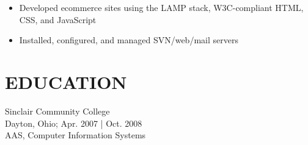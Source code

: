 \documentclass[margin,10pt]{res} %
\begin{document}
\begin{resume}
	\begin{itemize}
		\item Developed ecommerce sites using the LAMP stack, W3C-compliant HTML, CSS, and JavaScript
		\item Installed, configured, and managed SVN/web/mail servers
	\end{itemize}


	\section{EDUCATION}       Sinclair Community College  \\
	Dayton, Ohio; Apr. 2007 | Oct. 2008 \\
	AAS, Computer Information Systems

\end{resume}
\end{document}
